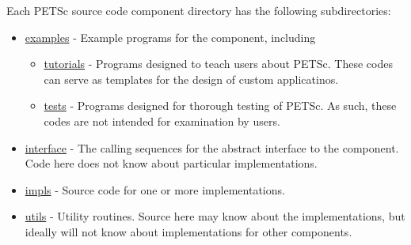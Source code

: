 Each PETSc source code component directory has the following subdirectories:
\begin{itemize}
\item  \url{examples} - Example programs for the component, including
  \begin{itemize}
  \item \url{tutorials} - Programs designed to teach users about PETSc.  These
          codes can serve as templates for the design of custom applicatinos.
  \item \url{tests} - Programs designed for thorough testing of PETSc.  As such,
          these codes are not intended for examination by users.
  \end{itemize}
\item  \url{interface} - The calling sequences for the abstract interface  
        to the component.
        Code here does not know about particular implementations.
\item  \url{impls} - Source code for one or more implementations.
\item  \url{utils} - Utility routines.  Source here may know about the 
          implementations, but ideally will not know about implementations
          for other components.
\end{itemize}

%
%


